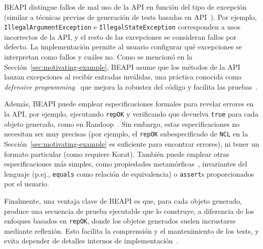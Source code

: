 \textsf{BEAPI} distingue fallos de mal uso de la API en función del tipo de excepción (similar a técnicas previas de generación de tests basadas en API~\cite{Pacheco07}).  
Por ejemplo, \texttt{IllegalArgumentException} e \texttt{IllegalStateException} corresponden a usos incorrectos de la API, y el resto de las excepciones se consideran fallos por defecto.  
La implementación permite al usuario configurar qué excepciones se interpretan como fallos y cuáles no.  
Como se mencionó en la Sección~\ref{sec:motivating-example}, \textsf{BEAPI} asume que los métodos de la API lanzan excepciones al recibir entradas inválidas, una práctica conocida como \textit{defensive programming}~\cite{Liskov00} que mejora la robustez del código y facilita las pruebas~\cite{Ammann16}.  

Además, \textsf{BEAPI} puede emplear especificaciones formales para revelar errores en la API, por ejemplo, ejecutando \texttt{repOK} y verificando que devuelva \texttt{true} para cada objeto generado, como en Randoop~\cite{Pacheco07}.  
Sin embargo, estas especificaciones no necesitan ser muy precisas (por ejemplo, el \texttt{repOK} subespecificado de \texttt{NCL} en la Sección~\ref{sec:motivating-example} es suficiente para encontrar errores), ni tener un formato particular (como requiere \textsf{Korat}).  
También puede emplear otras especificaciones más simples, como propiedades metamórficas~\cite{Chen19}, invariantes del lenguaje (p.ej., \texttt{equals} como relación de equivalencia) o \texttt{assert}s proporcionados por el usuario.  

Finalmente, una ventaja clave de \textsf{BEAPI} es que, para cada objeto generado, produce una secuencia de prueba ejecutable que lo construye, a diferencia de los enfoques basados en \texttt{repOK}, donde los objetos generados suelen incrustarse mediante reflexión.  
Esto facilita la comprensión y el mantenimiento de los tests, y evita depender de detalles internos de implementación~\cite{Braione17}.



